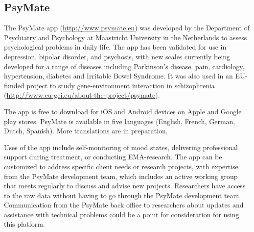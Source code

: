 \documentclass[]{book}
\begin{document}
\subsection{PsyMate}\label{psymate}


The PsyMate app (\url{http://www.psymate.eu}) was developed by the
Department of Psychiatry and Psychology at Maastricht University in the
Netherlands to assess psychological problems in daily life. The app has
been validated for use in depression, bipolar disorder, and psychosis,
with new scales currently being developed for a range of diseases
including Parkinson's disease, pain, cardiology, hypertension, diabetes
and Irritable Bowel Syndrome. It was also used in an EU-funded project
to study gene-environment interaction in schizophrenia
(\url{http://www.eu-gei.eu/about-the-project/psymate}).

The app is free to download for iOS and Android devices on Apple and
Google play stores. PsyMate is available in five languages (English,
French, German, Dutch, Spanish). More translations are in preparation.

Uses of the app include self-monitoring of mood states, delivering
professional support during treatment, or conducting EMA-research. The
app can be customized to address specific client needs or research
projects, with expertise from the PsyMate development team, which
includes an active working group that meets regularly to discuss and
advise new projects. Researchers have access to the raw data without
having to go through the PsyMate development team. Communication from
the PsyMate back office to researchers about updates and assistance with
technical problems could be a point for consideration for using this
platform.
\end{document}
